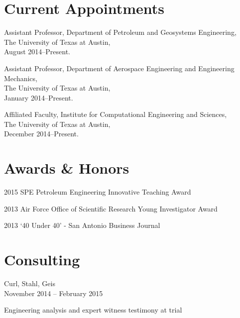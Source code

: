 \documentclass[12pt,letterpaper]{article}
\renewenvironment{itemize}{
  \begin{list}{}{
    \setlength{\leftmargin}{1.5em}
    \setlength{\itemsep}{0.25em}
    \setlength{\parskip}{0pt}
    \setlength{\parsep}{0.25em}
  }
}{
  \end{list}
}
\begin{document}
\section*{Current Appointments}

\begin{itemize}
    \item Assistant Professor, Department of Petroleum and Geosystems Engineering, \\ 
          The University of Texas at Austin, \\
          August 2014--Present. 

      \item Assistant Professor, Department of Aerospace Engineering and Engineering Mechanics, \\ 
          The University of Texas at Austin, \\
          January 2014--Present. 

    \item Affiliated Faculty, Institute for Computational Engineering and Sciences, \\ 
          The University of Texas at Austin, \\
          December 2014--Present. 
\end{itemize}
\fi

\section*{Awards \& Honors}

\begin{itemize}
    \item 2015 SPE Petroleum Engineering Innovative Teaching Award 
    \item 2013 Air Force Office of Scientific Research Young Investigator Award
    \item 2013 `40 Under 40' - San Antonio Business Journal
\end{itemize}


\ifdefined\ispdf
\section*{Consulting}

\begin{itemize}
    \item Curl, Stahl, Geis \\
          November 2014 -- February 2015
    \begin{itemize}
        \item Engineering analysis and expert witness testimony at trial
    \end{itemize}
\end{itemize}
\fi
\end{document}
